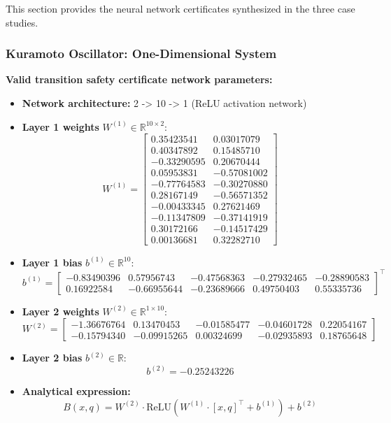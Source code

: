 This section provides the neural network certificates synthesized in the three case studies.

	\subsubsection{Kuramoto Oscillator: One-Dimensional System}
	\label{app:ko1d_neural}
	\textbf{Valid transition safety certificate network parameters:}
	\begin{itemize}
	    \item \textbf{Network architecture:} 2 -> 10 -> 1 (ReLU activation network)
	    \item \textbf{Layer 1 weights} $W^{(1)} \in \mathbb{R}^{10 \times 2}$:
	    \[
	    W^{(1)} = \begin{bmatrix}
	     0.35423541 &  0.03017079 \\
	     0.40347892 &  0.15485710 \\
	    -0.33290595 &  0.20670444 \\
	     0.05953831 & -0.57081002 \\
	    -0.77764583 & -0.30270880 \\
	     0.28167149 & -0.56571352 \\
	    -0.00433345 &  0.27621469 \\
	    -0.11347809 & -0.37141919 \\
	     0.30172166 & -0.14517429 \\
	     0.00136681 &  0.32282710
	    \end{bmatrix}
	    \]
	    
	    \item \textbf{Layer 1 bias} $b^{(1)} \in \mathbb{R}^{10}$:
	    \[
	    b^{(1)} = \begin{bmatrix}
	    -0.83490396 &  0.57956743 & -0.47568363 & -0.27932465 & -0.28890583 \\
	     0.16922584 & -0.66955644 & -0.23689666 &  0.49750403 &  0.55335736
	    \end{bmatrix}^\top
	    \]
	    
	    \item \textbf{Layer 2 weights} $W^{(2)} \in \mathbb{R}^{1 \times 10}$:
	    \[
	    W^{(2)} = \begin{bmatrix}
	    -1.36676764 &  0.13470453 & -0.01585477 & -0.04601728 &  0.22054167 \\
	    -0.15794340 & -0.09915265 &  0.00324699 & -0.02935893 &  0.18765648
	    \end{bmatrix}
	    \]
	    
	    \item \textbf{Layer 2 bias} $b^{(2)} \in \mathbb{R}$:
	    \[
	    b^{(2)} = -0.25243226
	    \]
	    
	    \item \textbf{Analytical expression:}
	    \[
	    B(x, q) = W^{(2)} \cdot \text{ReLU}(W^{(1)} \cdot [x, q]^\top + b^{(1)}) + b^{(2)}
	    \]
	\end{itemize}


